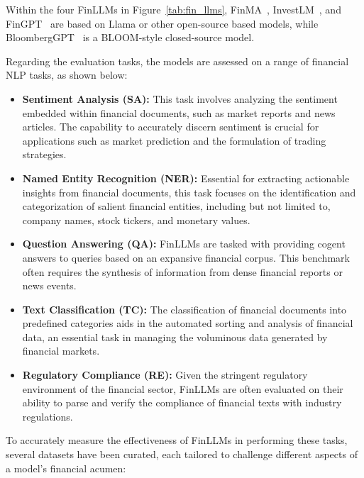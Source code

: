 Within the four FinLLMs in Figure~\ref{tab:fin_llms}, FinMA~\cite{xie2023pixiu}, InvestLM~\cite{yang2023investlm}, and FinGPT~\cite{wang2023fingpt} are based on Llama or other open-source based models, while BloombergGPT~\cite{wu2023bloomberggpt} is a BLOOM-style closed-source model.

Regarding the evaluation tasks, the models are assessed on a range of financial NLP tasks, as shown below:

\begin{itemize}
	\item \textbf{Sentiment Analysis (SA):} {This task involves analyzing the sentiment embedded within financial documents, such as market reports and news articles. The capability to accurately discern sentiment is crucial for applications such as market prediction and the formulation of trading strategies.}

	\item \textbf{Named Entity Recognition (NER):} {Essential for extracting actionable insights from financial documents, this task focuses on the identification and categorization of salient financial entities, including but not limited to, company names, stock tickers, and monetary values.}

	\item \textbf{Question Answering (QA):} {FinLLMs are tasked with providing cogent answers to queries based on an expansive financial corpus. This benchmark often requires the synthesis of information from dense financial reports or news events.}

	\item \textbf{Text Classification (TC):} {The classification of financial documents into predefined categories aids in the automated sorting and analysis of financial data, an essential task in managing the voluminous data generated by financial markets.}

	\item \textbf{Regulatory Compliance (RE):} {Given the stringent regulatory environment of the financial sector, FinLLMs are often evaluated on their ability to parse and verify the compliance of financial texts with industry regulations.}
\end{itemize}

To accurately measure the effectiveness of FinLLMs in performing these tasks, several datasets have been curated, each tailored to challenge different aspects of a model's financial acumen:

